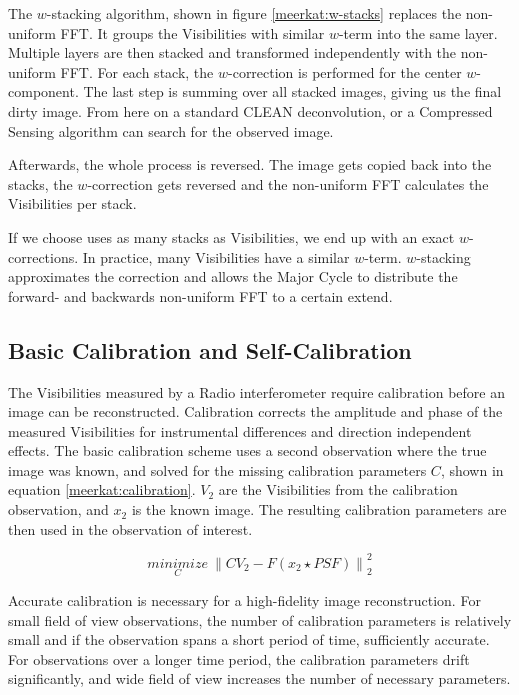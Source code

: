 The $w$-stacking algorithm, shown in figure \ref{meerkat:w-stacks} replaces the non-uniform FFT. It groups the Visibilities with similar $w$-term into the same layer. Multiple layers are then stacked and transformed independently with the non-uniform FFT. For each stack, the $w$-correction is performed for the center $w$-component. The last step is summing over all stacked images, giving us the final dirty image. From here on a standard CLEAN deconvolution, or a Compressed Sensing algorithm can search for the observed image.

Afterwards, the whole process is reversed. The image gets copied back into the stacks, the $w$-correction gets reversed and the non-uniform FFT calculates the Visibilities per stack.

If we choose uses as many stacks as Visibilities, we end up with an exact $w$-corrections. In practice, many Visibilities have a similar $w$-term. $w$-stacking approximates the correction and allows the Major Cycle to distribute the forward- and backwards non-uniform FFT to a certain extend.

\subsection{Basic Calibration and Self-Calibration}
The Visibilities measured by a Radio interferometer require calibration before an image can be reconstructed. Calibration corrects the amplitude and phase of the measured Visibilities for instrumental differences and direction independent effects. The basic calibration scheme uses a second observation where the true image was known, and solved for the missing calibration parameters $C$, shown in equation \eqref{meerkat:calibration}. $V_2$ are the Visibilities from the calibration observation, and $x_2$ is the known image. The resulting calibration parameters are then used in the observation of interest. 

\begin{equation}\label{meerkat:calibration}
\underset{C}{minimize} \: \left \| CV_2 - F(x_2 \star PSF) \right \|_2^2
\end{equation}

Accurate calibration is necessary for a high-fidelity image reconstruction. For small field of view observations, the number of calibration parameters is relatively small and if the observation spans a short period of time, sufficiently accurate. For observations over a longer time period, the calibration parameters drift significantly, and wide field of view increases the number of necessary parameters. 

